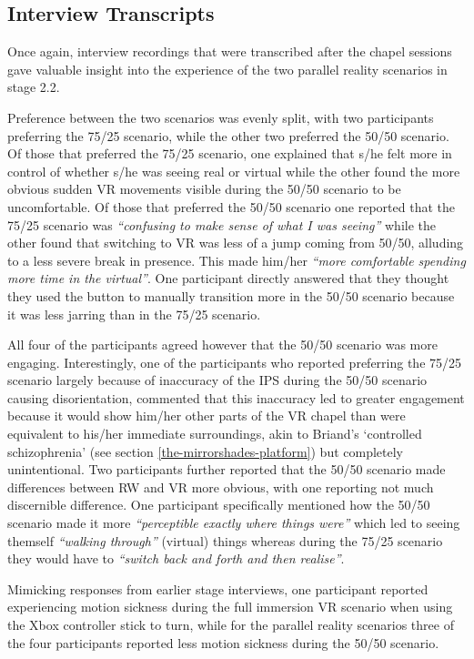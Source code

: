 \subsection{Interview Transcripts}

Once again, interview recordings that were transcribed after the chapel sessions gave valuable insight into the experience of the two parallel reality scenarios in stage 2.2.

Preference between the two scenarios was evenly split, with two participants preferring the 75/25 scenario, while the other two preferred the 50/50 scenario. Of those that preferred the 75/25 scenario, one explained that s/he felt more in control of whether s/he was seeing real or virtual while the other found the more obvious sudden VR movements visible during the 50/50 scenario to be uncomfortable. Of those that preferred the 50/50 scenario one reported that the 75/25 scenario was \textit{``confusing to make sense of what I was seeing''} while the other found that switching to VR was less of a jump coming from 50/50, alluding to a less severe break in presence. This made him/her \textit{``more comfortable spending more time in the virtual''}. One participant directly answered that they thought they used the button to manually transition more in the 50/50 scenario because it was less jarring than in the 75/25 scenario.

All four of the participants agreed however that the 50/50 scenario was more engaging. Interestingly, one of the participants who reported preferring the 75/25 scenario largely because of inaccuracy of the IPS during the 50/50 scenario causing disorientation, commented that this inaccuracy led to greater engagement because it would show him/her other parts of the VR chapel than were equivalent to his/her immediate surroundings, akin to Briand's `controlled schizophrenia' (see section \ref{the-mirrorshades-platform}) but completely unintentional. Two participants further reported that the 50/50 scenario made differences between RW and VR more obvious, with one reporting not much discernible difference. One participant specifically mentioned how the 50/50 scenario made it more \textit{``perceptible exactly where things were''} which led to seeing themself \textit{``walking through''} (virtual) things whereas during the 75/25 scenario they would have to \textit{``switch back and forth and then realise''}.

Mimicking responses from earlier stage interviews, one participant reported experiencing motion sickness during the full immersion VR scenario when using the Xbox controller stick to turn, while for the parallel reality scenarios three of the four participants reported less motion sickness during the 50/50 scenario.

